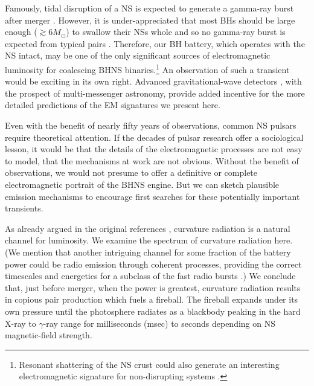 Famously, tidal disruption of a NS is expected to generate a gamma-ray
burst after merger \citep{NPP:NSBH_GRB:1992}. However, it is
under-appreciated that most BHs should be large enough ($\gtrsim
6M_\odot $) to swallow their NSs whole and so no gamma-ray burst is
expected from typical pairs \citep{Ozel:2010}. Therefore, our BH
battery, which operates with the NS intact, may be one of the only
significant sources of electromagnetic luminosity for coalescing BHNS binaries.\footnote{Resonant shattering of the NS crust could also generate an interesting electromagnetic 
signature for non-disrupting systems \citep{Tsang:2012, Tsang:2013}.}
% 
An observation of such a transient would be exciting in its own right.
Advanced gravitational-wave detectors \citep[{\em
    e.g.},][]{AdLIGO:2010}, with the prospect of multi-messenger
astronomy, provide added incentive for the more detailed predictions
of the EM signatures we present here.

Even with the benefit of nearly fifty years of observations, common NS
pulsars require theoretical attention. If the decades of pulsar
research offer a sociological lesson, it would be that the details of
the electromagnetic processes are not easy to model, that the
mechanisms at work are not obvious. Without the benefit of
observations, we would not presume to offer a definitive or complete
electromagnetic portrait of the BHNS engine. But we can sketch
plausible emission mechanisms to encourage first searches for these
potentially important transients.



As already argued in the original references
\citep{McL:2011,DorazioLevin:2013}, curvature radiation is a natural
channel for luminosity.  We examine the spectrum of curvature
radiation here.  (We mention that another intriguing channel for some
fraction of the battery power could be radio emission through coherent
processes, providing the correct timescales and energetics for a
subclass of the fast radio bursts \citep{Chiara:2015}.)  We conclude
that, just before merger, when the power is greatest, curvature
radiation results in copious pair production which fuels a
fireball. The fireball expands under its own pressure until the
photosphere radiates as a blackbody peaking in the hard X-ray to
$\gamma$-ray range for milliseconds (msec) to seconds depending on NS
magnetic-field strength.  

